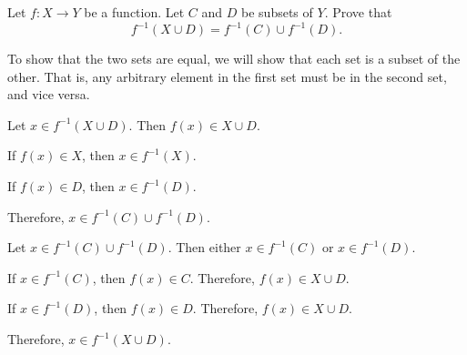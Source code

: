 \begin{problem}
  Let $f : X \to Y$ be a function.
  Let $C$ and $D$ be subsets of $Y$.
  Prove that \[ f^{-1}(X \cup D) = f^{-1}(C) \cup f^{-1}(D). \]
\end{problem}

\begin{answer}
  To show that the two sets are equal, we will show that each set is a subset
  of the other. That is, any arbitrary element in the first set must be in
  the second set, and vice versa.

  \begin{enumroman}
    \item Let $x \in f^{-1}(X \cup D)$. Then $f(x) \in X \cup D$.
      \begin{enumarabic}
        \item If $f(x) \in X$, then $x \in f^{-1}(X)$.
        \item If $f(x) \in D$, then $x \in f^{-1}(D)$.
      \end{enumarabic}
      Therefore, $x \in f^{-1}(C) \cup f^{-1}(D)$.

    \item Let $x \in f^{-1}(C) \cup f^{-1}(D)$. Then either $x \in f^{-1}(C)$
      or $x \in f^{-1}(D)$.
      \begin{enumarabic}
        \item If $x \in f^{-1}(C)$, then $f(x) \in C$.
          Therefore, $f(x) \in X \cup D$.
        \item If $x \in f^{-1}(D)$, then $f(x) \in D$.
          Therefore, $f(x) \in X \cup D$.
      \end{enumarabic}
      Therefore, $x \in f^{-1}(X \cup D)$.
  \end{enumroman}
\end{answer}
